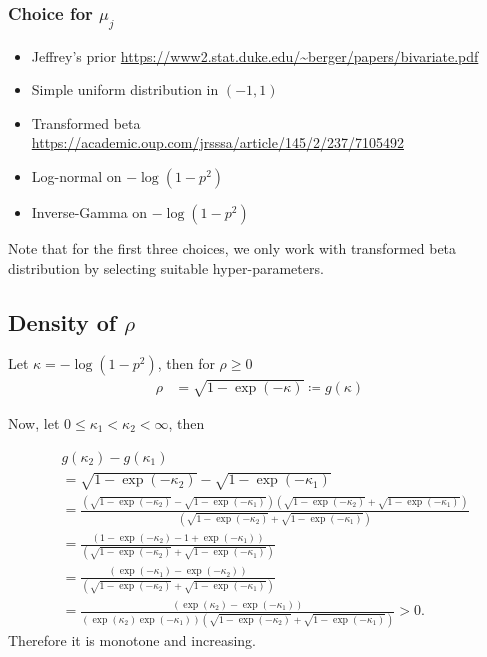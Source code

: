 \documentclass{amsart}
\begin{document}
\subsubsection{Choice for $\mu_j$}
\begin{itemize}
    \item Jeffrey's prior \url{https://www2.stat.duke.edu/~berger/papers/bivariate.pdf}
    \item Simple uniform distribution in $(-1,1)$ 
    \item Transformed beta \url{https://academic.oup.com/jrsssa/article/145/2/237/7105492}
    \item Log-normal on $-\log(1-p^2)$
    \item Inverse-Gamma on $-\log(1-p^2)$
\end{itemize}
Note that for the first three choices, we only work with transformed beta distribution by 
selecting suitable hyper-parameters.

\subsection{Density of $\rho$}

Let $\kappa = -\log(1-p^2)$, then for $\rho \ge 0$
\begin{align}
	\rho & = \sqrt{1-\exp(-\kappa)}\coloneqq g(\kappa)
\end{align}

Now, let $0\le\kappa_1 < \kappa_2<\infty$, then

\begin{align}
	&g(\kappa_2) - g(\kappa_1)\\
	&=\sqrt{1-\exp(-\kappa_2)} - \sqrt{1-\exp(-\kappa_1)}\\
	&= \frac{(\sqrt{1-\exp(-\kappa_2)} - \sqrt{1-\exp(-\kappa_1)})(\sqrt{1-\exp(-\kappa_2)} + \sqrt{1-\exp(-\kappa_1)})}{(\sqrt{1-\exp(-\kappa_2)} + \sqrt{1-\exp(-\kappa_1)})}\\
	&= \frac{(1-\exp(-\kappa_2) - 1+\exp(-\kappa_1))}{(\sqrt{1-\exp(-\kappa_2)} + \sqrt{1-\exp(-\kappa_1)})}\\
	&= \frac{(\exp(-\kappa_1)-\exp(-\kappa_2))}{(\sqrt{1-\exp(-\kappa_2)} + \sqrt{1-\exp(-\kappa_1)})}\\
	&= \frac{(\exp(\kappa_2)-\exp(-\kappa_1))}
	{(\exp(\kappa_2)\exp(-\kappa_1))(\sqrt{1-\exp(-\kappa_2)} + \sqrt{1-\exp(-\kappa_1)})} >0.
\end{align}
Therefore it is monotone and increasing.
\end{document}
